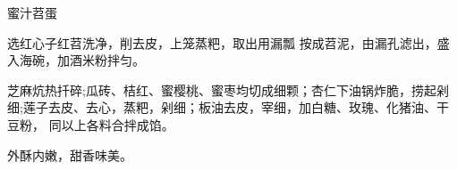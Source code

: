 \begin{recipe}[八宝苕蛋]{蜜汁苕蛋}

\ingredients


\cooking

\step 选红心子红苕洗净，削去皮，上笼蒸粑，取出用漏瓢 按成苕泥，由漏孔滤出，盛
入海碗，加酒米粉拌匀。

\step 芝麻炕热扦碎;瓜砖、桔红、蜜樱桃、蜜枣均切成细颗；杏仁下油锅炸脆，捞起剁
细;莲子去皮、去心，蒸粑，剁细；板油去皮，宰细，加白糖、玫瑰、化猪油、干豆粉，
同以上各料合拌成馅。

\features

外酥内嫩，甜香味美。

\end{recipe}

